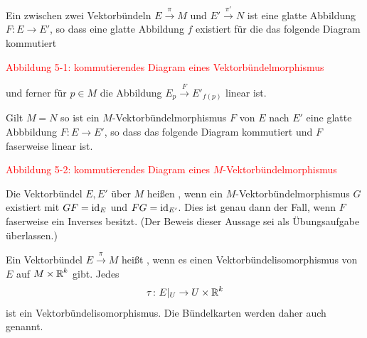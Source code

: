 Ein  zwischen zwei Vektorbündeln $E \xrightarrow{\pi} M$ und $E' \xrightarrow{\pi'} N$ ist eine glatte Abbildung $F \colon E \to E'$, so dass eine glatte Abbildung $f$ existiert für die das folgende Diagram kommutiert

\textcolor{red}{Abbildung 5-1: kommutierendes Diagram eines Vektorbündelmorphismus}

und ferner für $p \in M$ die Abbildung $E_p \xrightarrow{F} E'_{f(p)}$ linear ist.

Gilt $M = N$ so ist ein $M$-Vektorbündelmorphismus $F$ von $E$ nach $E'$ eine glatte Abbbildung $F \colon E \to E'$, so dass das folgende Diagram kommutiert und $F$ faserweise linear ist.

\textcolor{red}{Abbildung 5-2: kommutierendes Diagram eines $M$-Vektorbündelmorphismus}

Die Vektorbündel $E,E'$ über $M$ heißen , wenn ein $M$-Vektorbündelmorphismus
$G$ existiert mit $G F = \operatorname{id}_E$ und $FG = \operatorname{id}_{E'}$.
Dies ist genau dann der Fall, wenn $F$ faserweise ein Inverses besitzt.
(Der Beweis dieser Aussage sei als Übungsaufgabe überlassen.)

Ein Vektorbündel $E \xrightarrow{\pi} M$ heißt , wenn es einen Vektorbündelisomorphismus von $E$ auf $M \times \operatorname{\mathbb{R}}^k$ gibt. Jedes
\begin{align*}
  \tau \colon E|_U \to U \times \operatorname{\mathbb{R}}^k
\end{align*}
ist ein Vektorbündelisomorphismus.
Die Bündelkarten werden daher auch  genannt.

